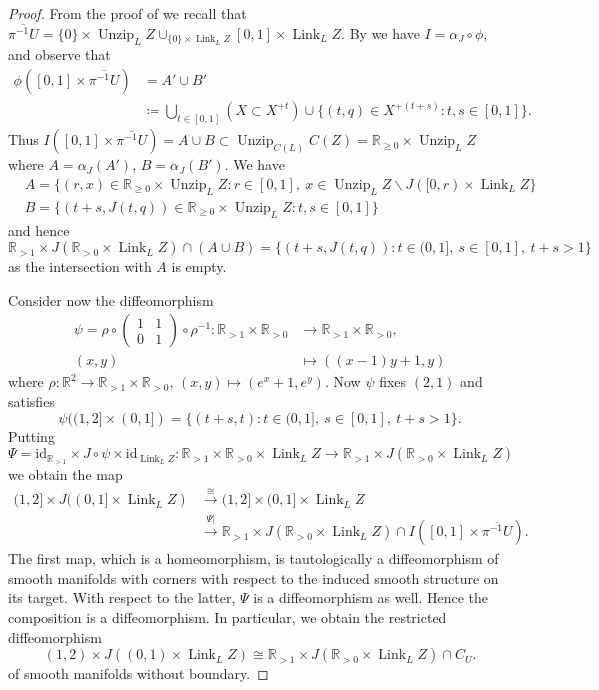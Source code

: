 \documentclass[11pt]{amsart}
\newcommand{\mbb}[1]{\mathbb{#1}}
\newcommand{\R}{\mbb{R}}
\newcommand{\id}{\mathrm{id}}
\DeclareMathOperator{\Unzip}{Unzip}
\DeclareMathOperator{\Link}{Link}
\numberwithin{equation}{section}
\theoremstyle{definition}
\theoremstyle{remark}
\theoremstyle{plain}
\begin{document}
\begin{proof}
    From the proof of  we recall that
    \(
        \overline{\pi^{-1}U}=\{0\}\times\Unzip_LZ\cup_{\{0\}\times\Link_LZ}[0,1]\times\Link_LZ.
    \)
    By  we have $I=\alpha_J\circ\phi$, and observe that 
    \begin{align*}
        \phi([0,1]\times\overline{\pi^{-1}U})&= A'\cup B'\\
        &\coloneqq\bigcup_{t\in[0,1]}(X\subset X^{+t})\cup\{(t,q)\in X^{+(t+s)} : t,s\in[0,1]\}.
    \end{align*}
    Thus $I([0,1]\times\overline{\pi^{-1}U})=A\cup B\subset\Unzip_{C(L)}C(Z)=\R_{\geq0}\times\Unzip_LZ$ where $A=\alpha_J(A')$, $B=\alpha_J(B')$. We have 
    \begin{align*}
        &A=\{(r,x)\in\R_{\geq0}\times\Unzip_LZ : r\in[0,1],\ x\in \Unzip_LZ\smallsetminus J([0,r)\times\Link_LZ\}\\
        &B=\{(t+s,J(t,q))\in\R_{\geq0}\times\Unzip_LZ : t,s\in[0,1]\}
    \end{align*}
    and hence
    \[
        \R_{>1}\times J(\R_{>0}\times\Link_LZ)\cap(A\cup B)=\{(t+s,J(t,q)) : t\in(0,1],\ s\in[0,1],\ t+s>1\}
    \]
    as the intersection with $A$ is empty.

    Consider now the diffeomorphism 
    \begin{align*}
    \psi=\rho\circ\begin{pmatrix}
        1 & 1\\ 
        0 & 1
    \end{pmatrix}\circ\rho^{-1}\colon\R_{>1}\times\R_{>0}&\to\R_{>1}\times\R_{>0},\\
     (x,y)&\mapsto ((x-1)y+1,y)
    \end{align*} 
    where $\rho\colon\R^2\to\R_{>1}\times\R_{>0}$, $(x,y)\mapsto(e^x+1,e^y)$. Now $\psi$ fixes $(2,1)$ and satisfies 
    \[
        \psi((1,2]\times(0,1])=\{(t+s,t) : t\in(0,1],\ s\in[0,1],\ t+s>1\}.
    \] 
    Putting 
    \[
        \Psi=\id_{\R_{>1}}\times J\circ\psi\times\id_{\Link_LZ}\colon\R_{>1}\times\R_{>0}\times\Link_LZ\to\R_{>1}\times J(\R_{>0}\times\Link_LZ)
    \] 
    we obtain the map
    \begin{align*}
        (1,2]\times J((0,1]\times\Link_LZ)&\xrightarrow{\cong}(1,2]\times(0,1]\times\Link_LZ\\
        &\xrightarrow{\Psi|}\R_{>1}\times J(\R_{>0}\times\Link_LZ)\cap I([0,1]\times\overline{\pi^{-1}U}).
    \end{align*}
    The first map, which is a homeomorphism, is tautologically a diffeomorphism of smooth manifolds with corners with respect to the induced smooth structure on its target. With respect to the latter, $\Psi$ is a diffeomorphism as well. Hence the composition is a diffeomorphism. In particular, we obtain the restricted diffeomorphism
    \[
        (1,2)\times J((0,1)\times\Link_LZ)\cong\R_{>1}\times J(\R_{>0}\times\Link_LZ)\cap C_{U}.
    \]
    of smooth manifolds without boundary.


\end{proof}
\end{document}
